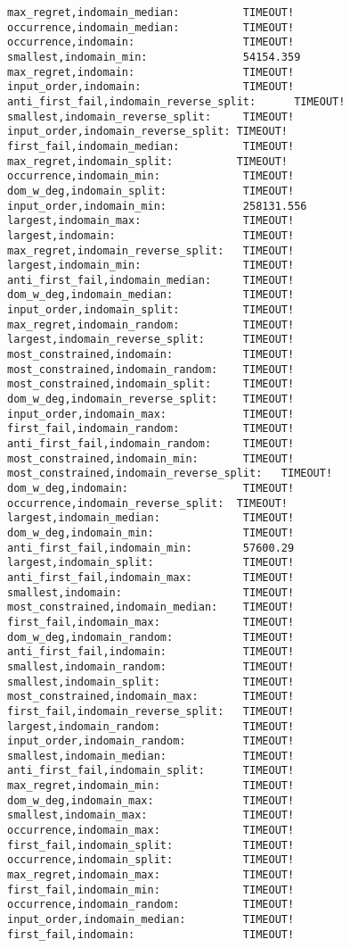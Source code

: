 \documentclass[11pt]{article}
\begin{document}
\begin{verbatim}
max_regret,indomain_median:          TIMEOUT!
occurrence,indomain_median:          TIMEOUT!
occurrence,indomain:                 TIMEOUT!
smallest,indomain_min:               54154.359
max_regret,indomain:                 TIMEOUT!
input_order,indomain:                TIMEOUT!
anti_first_fail,indomain_reverse_split:      TIMEOUT!
smallest,indomain_reverse_split:     TIMEOUT!
input_order,indomain_reverse_split:	TIMEOUT!
first_fail,indomain_median:          TIMEOUT!
max_regret,indomain_split:	        TIMEOUT!
occurrence,indomain_min:             TIMEOUT!
dom_w_deg,indomain_split:            TIMEOUT!
input_order,indomain_min:            258131.556
largest,indomain_max:                TIMEOUT!
largest,indomain:                    TIMEOUT!
max_regret,indomain_reverse_split:   TIMEOUT!
largest,indomain_min:                TIMEOUT!
anti_first_fail,indomain_median:     TIMEOUT!
dom_w_deg,indomain_median:           TIMEOUT!
input_order,indomain_split:          TIMEOUT!
max_regret,indomain_random:          TIMEOUT!
largest,indomain_reverse_split:      TIMEOUT!
most_constrained,indomain:           TIMEOUT!
most_constrained,indomain_random:    TIMEOUT!
most_constrained,indomain_split:     TIMEOUT!
dom_w_deg,indomain_reverse_split:    TIMEOUT!
input_order,indomain_max:            TIMEOUT!
first_fail,indomain_random:          TIMEOUT!
anti_first_fail,indomain_random:     TIMEOUT!
most_constrained,indomain_min:       TIMEOUT!
most_constrained,indomain_reverse_split:   TIMEOUT!
dom_w_deg,indomain:                  TIMEOUT!
occurrence,indomain_reverse_split:	TIMEOUT!
largest,indomain_median:             TIMEOUT!
dom_w_deg,indomain_min:              TIMEOUT!
anti_first_fail,indomain_min:        57600.29
largest,indomain_split:              TIMEOUT!
anti_first_fail,indomain_max:        TIMEOUT!
smallest,indomain:                   TIMEOUT!
most_constrained,indomain_median:    TIMEOUT!
first_fail,indomain_max:             TIMEOUT!
dom_w_deg,indomain_random:           TIMEOUT!
anti_first_fail,indomain:            TIMEOUT!
smallest,indomain_random:            TIMEOUT!
smallest,indomain_split:             TIMEOUT!
most_constrained,indomain_max:       TIMEOUT!
first_fail,indomain_reverse_split:   TIMEOUT!
largest,indomain_random:             TIMEOUT!
input_order,indomain_random:         TIMEOUT!
smallest,indomain_median:            TIMEOUT!
anti_first_fail,indomain_split:      TIMEOUT!
max_regret,indomain_min:             TIMEOUT!
dom_w_deg,indomain_max:              TIMEOUT!
smallest,indomain_max:               TIMEOUT!
occurrence,indomain_max:             TIMEOUT!
first_fail,indomain_split:           TIMEOUT!
occurrence,indomain_split:           TIMEOUT!
max_regret,indomain_max:             TIMEOUT!
first_fail,indomain_min:             TIMEOUT!
occurrence,indomain_random:          TIMEOUT!
input_order,indomain_median:         TIMEOUT!
first_fail,indomain:                 TIMEOUT!
\end{verbatim}   
\end{document}
